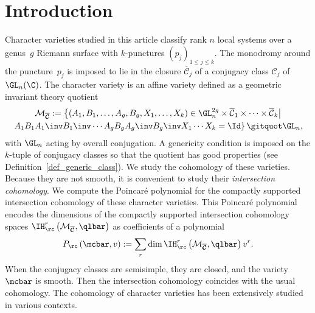 \Changel

\section{Introduction}
Character varieties studied in this article classify rank $n$ local systems over a genus~$g$ Riemann surface with $k$-punctures $(p_j)_{1\le j \le k}$. The monodromy around the puncture~$p_j$ is imposed to lie in the closure $\overline{\mathcal{C}}_j$ of a conjugacy class $\mathcal{C}_j$ of $\GL_n(\C)$. The character variety is an affine variety defined as a geometric invariant theory quotient
\begin{multline*}
\mathcal{M}_{\boldsymbol{\overline{\mathcal{C}}}}:=\left\lbrace\left(A_1,B_1,\dots,A_g,B_g,X_1,\dots,X_k\right)\in \GL_n^{2g}\times \overline{\mathcal{C}}_{1}\times\dots\times \overline{\mathcal{C}}_{k}\right| \\ \left. A_1 B_1 A_1\inv B_1\inv \cdots A_g B_g A_g\inv B_g\inv X_1\cdots X_k =\Id\right\rbrace \gitquot \GL_n,
\end{multline*}
with $\GL_n$ acting by overall conjugation. A genericity condition is imposed on the $k$\nobreakdash-tuple of conjugacy classes so that the quotient has good properties (see Definition~\ref{def_generic_class}). We study the cohomology of these varieties. Because they are not smooth, it is convenient to study their \textit{intersection cohomology}. We compute the Poincaré polynomial for the compactly supported intersection cohomology of these character varieties. This Poincaré polynomial encodes the dimensions of the compactly supported intersection cohomology spaces $\IH_{\rc}^r\left(\mathcal{M}_{\boldsymbol{\overline{\mathcal{C}}}}, \qlbar\right)$ as coefficients of a polynomial\vspace*{-2pt}\enlargethispage{.5\baselineskip}
\[
P_{\rc} \left(\mcbar, v\right):=\sum_r \dim \IH_{\rc}^r\left(\mathcal{M}_{\boldsymbol{\overline{\mathcal{C}}}}, \qlbar\right) v^r.
\]
When the conjugacy classes are semisimple, they are closed, and the variety $\mcbar$ is smooth. Then the intersection cohomology coincides with the usual cohomology. The cohomology of character varieties has been extensively studied in various contexts.

